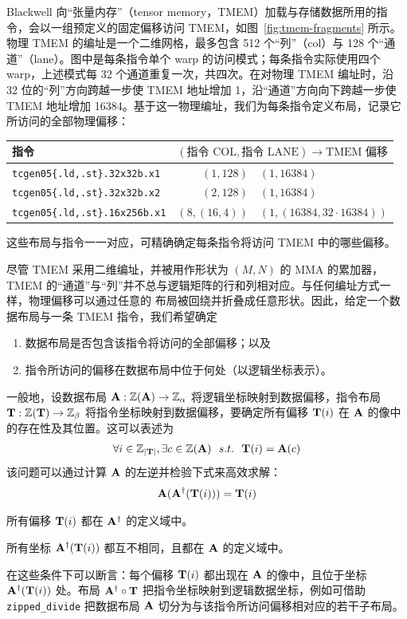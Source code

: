Blackwell 向“张量内存”（tensor memory，TMEM）加载与存储数据所用的指令，会以一组预定义的固定偏移访问 TMEM，如图~\ref{fig:tmem-fragments} 所示。物理 TMEM 的编址是一个二维网格，最多包含 512 个“列”（col）与 128 个“通道”（lane）。图中是每条指令单个 warp 的访问模式；每条指令实际使用四个 warp，上述模式每 32 个通道重复一次，共四次。在对物理 TMEM 编址时，沿 32 位的“列”方向跨越一步使 TMEM 地址增加 1，沿“通道”方向向下跨越一步使 TMEM 地址增加 16384。基于这一物理编址，我们为每条指令定义布局，记录它所访问的全部物理偏移：
\begin{center}
\begin{tabular}{l | r@{:}l}
\quad\quad\quad\quad \textbf{指令} & \multicolumn{2}{c}{$(\text{指令 COL}, \text{指令 LANE}) \to \text{TMEM 偏移}$} \\
\hline
\texttt{tcgen05\{.ld,.st\}.32x32b.x1} & $(1,128)$ & $(1,16384)$ \\
\texttt{tcgen05\{.ld,.st\}.32x32b.x2} & $(2,128)$ & $(1,16384)$ \\
\texttt{tcgen05\{.ld,.st\}.16x256b.x1} & $(8,(16,4))$ & $(1,(16384,32\cdot 16384))$ \\
\end{tabular}
\end{center}
这些布局与指令一一对应，可精确确定每条指令将访问 TMEM 中的哪些偏移。

尽管 TMEM 采用二维编址，并被用作形状为 $(M,N)$ 的 MMA 的累加器，TMEM 的“通道”与“列”并不总与逻辑矩阵的行和列相对应。与任何编址方式一样，物理偏移可以通过任意的 \CuTe{} 布局被回绕并折叠成任意形状。因此，给定一个数据布局与一条 TMEM 指令，我们希望确定
\begin{enumerate}[itemsep=0pt,topsep=2pt]
\item 数据布局是否包含该指令将访问的全部偏移；以及
\item 指令所访问的偏移在数据布局中位于何处（以逻辑坐标表示）。
\end{enumerate}

一般地，设数据布局 $\mathbf{A} : \mathbb{Z}(\mathbf{A}) \to \mathbb{Z}_\alpha$ 将逻辑坐标映射到数据偏移，指令布局 $\mathbf{T} : \mathbb{Z}(\mathbf{T}) \to \mathbb{Z}_\beta$ 将指令坐标映射到数据偏移，要确定所有偏移 $\mathbf{T}(i)$ 在 $\mathbf{A}$ 的像中的存在性及其位置。这可以表述为
\begin{align*}
\forall i \in \Z_{\abs{\v{T}}}, \exists c \in \Z(\v{A}) \ \ s.t. \ \ \v{T}(i) = \v{A}(c)
\end{align*}
该问题可以通过计算 $\mathbf{A}$ 的左逆并检验下式来高效求解：
\begin{align*}
\mathbf{A}(\mathbf{A}^\dagger(\mathbf{T}(i))) = \mathbf{T}(i)
\end{align*}
\begin{compactitem}
\item 所有偏移 $\mathbf{T}(i)$ 都在 $\mathbf{A}^\dagger$ 的定义域中。
\item 所有坐标 $\mathbf{A}^\dagger(\mathbf{T}(i))$ 都互不相同，且都在 $\mathbf{A}$ 的定义域中。
\end{compactitem}
在这些条件下可以断言：每个偏移 $\mathbf{T}(i)$ 都出现在 $\mathbf{A}$ 的像中，且位于坐标 $\mathbf{A}^\dagger(\mathbf{T}(i))$ 处。布局 $\mathbf{A}^\dagger \circ \mathbf{T}$ 把指令坐标映射到逻辑数据坐标，例如可借助 {\tt zipped\_divide} 把数据布局 $\mathbf{A}$ 切分为与该指令所访问偏移相对应的若干子布局。

